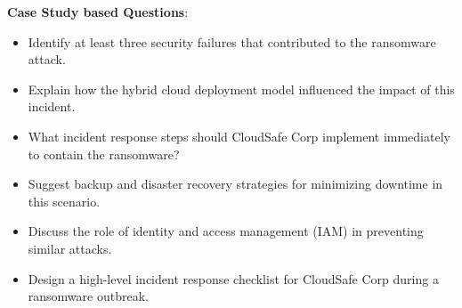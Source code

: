 \noindent\textbf{Case Study based Questions}:

\begin{itemize}
    \item Identify at least three security failures that contributed to the ransomware attack.
    \item Explain how the hybrid cloud deployment model influenced the impact of this incident.
    \item What incident response steps should CloudSafe Corp implement immediately to contain the ransomware?
    \item Suggest backup and disaster recovery strategies for minimizing downtime in this scenario.
    \item Discuss the role of identity and access management (IAM) in preventing similar attacks.
    \item Design a high-level incident response checklist for CloudSafe Corp during a ransomware outbreak.
\end{itemize}